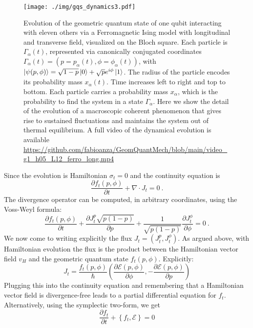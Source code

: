 \documentclass[draft,nofootinbib,pre,twocolumn,showpacs,showkeys,preprintnumbers,floatfix]{revtex4-1}
\newcommand{\1}{\mathbbm{1}}
\newcommand{\p}{\partial}
\begin{document}
\begin{figure}[t!]
\centering
\texttt{[image: ./img/gqs\_dynamics3.pdf]}
\caption{Evolution of the geometric quantum state of one qubit interacting with 
	eleven others via a Ferromagnetic Ising model with longitudinal and transverse field, 
	visualized on the Bloch square. Each particle is $\Gamma_\alpha(t)$, represented via
	canonically conjugated coordinates $\Gamma_\alpha(t) = \left( p=p_\alpha(t),\phi=\phi_\alpha(t)\right)$, with $\ket{\psi(p,\phi)} = 
	\sqrt{1-p} \ket{0}+ \sqrt{p} e^{i\phi}\ket{1}$. The radius of the particle encodes its 
	probability mass $x_\alpha(t)$. Time increases left to right and top to bottom. Each particle
	carries a probability mass $x_\alpha$, which is the probability to find the system in a 
	state $\Gamma_\alpha$. Here we show the detail of the evolution of a macroscopic 
	coherent phenomenon that gives rise to sustained fluctuations and maintains the
	system out of thermal equilibrium. A full video of the dynamical evolution is available 
	\url{https://github.com/fabioanza/GeomQuantMech/blob/main/video_g1_h05_L12_ferro_long.mp4}
	}
\label{fig:gqs_dynamics3}
\end{figure}
Since the evolution is Hamiltonian $\sigma_t=0$ and the continuity equation is 
\begin{equation}
\frac{\partial f_t(p,\phi)}{\partial t} + \nabla \cdot J_t = 0~.
\end{equation}
The divergence operator can be computed, in arbitrary coordinates, using the Voss-Weyl formula: 
\begin{equation}
\frac{\partial f_t(p,\phi)}{\partial t} + \frac{\p J_t^p \sqrt{p(1-p)}}{\p p} + \frac{1}{\sqrt{p(1-p)}}\frac{\p J_t^{\phi}}{\p \phi} = 0~.
\end{equation}
We now come to writing explicitly the flux $J_t = (J_t^p,J_t^{\phi})$. As argued above, 
with Hamiltonian evolution the flux is the product between the Hamiltonian vector 
field $v_H$ and the geometric quantum state $f_t(p,\phi)$. Explicitly:
\begin{equation}
J_t =  \frac{f_t(p,\phi)}{\hbar} \left(\frac{\p \mathcal{E}(p,\phi)}{\p \phi}, -\frac{\p \mathcal{E}(p,\phi)}{\p p}\right)
\end{equation}
Plugging this into the continuity equation and remembering that a Hamiltonian vector field is 
divergence-free leads to a partial differential equation for $f_t$. Alternatively, using the symplectic two-form, we get
\begin{equation}
\frac{\partial f_t}{\partial t} + \left\{ f_t, \mathcal{E}\right\} = 0
\end{equation}
\end{document}

